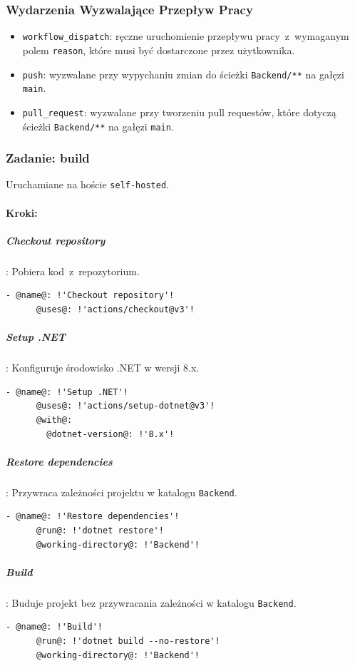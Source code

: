 \subsubsection{Wydarzenia Wyzwalające Przepływ Pracy}
\begin{itemize}
    \item \texttt{\textcolor{codeblue}{workflow\_dispatch}}: ręczne uruchomienie przepływu pracy~z~wymaganym polem \texttt{\textcolor{codeblue}{reason}}, które musi być dostarczone przez użytkownika.
    \item \texttt{\textcolor{codeblue}{push}}: wyzwalane przy wypychaniu zmian do ścieżki \texttt{\textcolor{codeblue}{Backend/**}} na gałęzi \texttt{\textcolor{codeblue}{main}}.
    \item \texttt{\textcolor{codeblue}{pull\_request}}: wyzwalane przy tworzeniu pull requestów, które dotyczą ścieżki \texttt{\textcolor{codeblue}{Backend/**}} na gałęzi \texttt{\textcolor{codeblue}{main}}.
\end{itemize}

\subsubsection{Zadanie: build}
Uruchamiane na hoście \texttt{\textcolor{codeblue}{self-hosted}}.
\paragraph{Kroki:}
\subparagraph{Checkout repository}: Pobiera kod~z~repozytorium.
\begin{lstlisting}[style=yaml-colored]
    - @name@: !'Checkout repository'!
      @uses@: !'actions/checkout@v3'!
\end{lstlisting}

\subparagraph{Setup .NET}: Konfiguruje środowisko .NET w wersji 8.x.
\begin{lstlisting}[style=yaml-colored]
    - @name@: !'Setup .NET'!
      @uses@: !'actions/setup-dotnet@v3'!
      @with@:
        @dotnet-version@: !'8.x'!
\end{lstlisting}

\subparagraph{Restore dependencies}: Przywraca zależności projektu w katalogu \texttt{\textcolor{codeblue}{Backend}}.
\begin{lstlisting}[style=yaml-colored]
    - @name@: !'Restore dependencies'!
      @run@: !'dotnet restore'!
      @working-directory@: !'Backend'!
\end{lstlisting}

\subparagraph{Build}: Buduje projekt bez przywracania zależności w katalogu \texttt{\textcolor{codeblue}{Backend}}.
\begin{lstlisting}[style=yaml-colored]
    - @name@: !'Build'!
      @run@: !'dotnet build --no-restore'!
      @working-directory@: !'Backend'!
\end{lstlisting}

